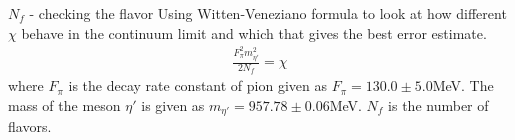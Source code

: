 \documentclass[10pt]{beamer}
\begin{document}
\begin{frame}{$N_f$ - checking the flavor}
	Using Witten-Veneziano formula to look at how different $\chi$ behave in the continuum limit and which that gives the best error estimate.
	\begin{align*}
		\frac{F_\pi^2 m_{\eta'}^2}{2 N_f} = \chi
	\end{align*}
	where $F_\pi$ is the decay rate constant of pion given as $F_\pi=130.0\pm5.0$MeV. The mass of the meson $\eta'$ is given as $m_{\eta'}=957.78\pm0.06$MeV. $N_f$ is the number of flavors.
\end{frame}




\end{document}

